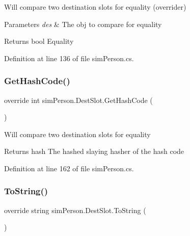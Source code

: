 Will compare two destination slots for equality (overrider)


\begin{DoxyParams}{Parameters}
{\em des} & The obj to compare for equality \\
\hline
\end{DoxyParams}
\begin{DoxyReturn}{Returns}
bool Equality 
\end{DoxyReturn}


Definition at line 136 of file sim\+Person.\+cs.

\hypertarget{classsim_person_1_1_dest_slot_aedbbf932f62b4aae95b842ebd5519d84}{}\label{classsim_person_1_1_dest_slot_aedbbf932f62b4aae95b842ebd5519d84} 
\subsubsection{\texorpdfstring{Get\+Hash\+Code()}{GetHashCode()}}
{\footnotesize\ttfamily override int sim\+Person.\+Dest\+Slot.\+Get\+Hash\+Code (\begin{DoxyParamCaption}{ }\end{DoxyParamCaption})}

Will compare two destination slots for equality

\begin{DoxyReturn}{Returns}
hash The hashed slaying hasher of the hash code 
\end{DoxyReturn}


Definition at line 162 of file sim\+Person.\+cs.

\hypertarget{classsim_person_1_1_dest_slot_acc639bb6bf443fc68c0c591e5440c3de}{}\label{classsim_person_1_1_dest_slot_acc639bb6bf443fc68c0c591e5440c3de} 
\subsubsection{\texorpdfstring{To\+String()}{ToString()}}
{\footnotesize\ttfamily override string sim\+Person.\+Dest\+Slot.\+To\+String (\begin{DoxyParamCaption}{ }\end{DoxyParamCaption})}

